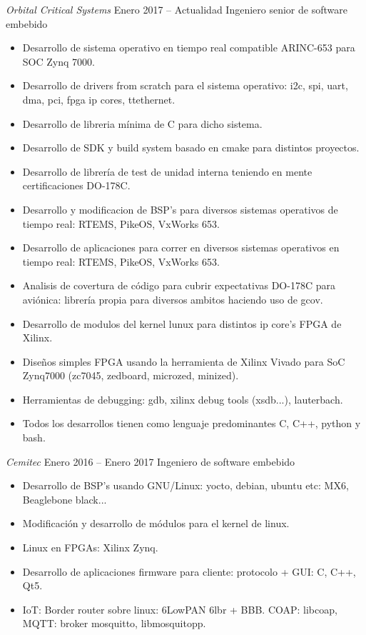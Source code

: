 \documentclass[10pt]{res} %
\begin{document}
\begin{resume}
{\sl Orbital Critical Systems} \hfill Enero 2017 -- Actualidad
\hfill Ingeniero senior de software embebido
\begin{itemize} \itemsep -2pt %
\item Desarrollo de sistema operativo en tiempo real compatible ARINC-653 para SOC Zynq 7000.
\item Desarrollo de drivers from scratch para el sistema operativo: i2c, spi, uart, dma, pci, fpga ip cores, ttethernet.
\item Desarrollo de libreria mínima de C para dicho sistema.
\item Desarrollo de SDK y build system basado en cmake para distintos proyectos.
\item Desarrollo de librería de test de unidad interna teniendo en mente certificaciones DO-178C.
\item Desarrollo y modificacion de BSP's para diversos sistemas operativos de tiempo real: RTEMS, PikeOS, VxWorks 653.
\item Desarrollo de aplicaciones para correr en diversos sistemas operativos en tiempo real: RTEMS, PikeOS, VxWorks 653.
\item Analisis de covertura de código para cubrir expectativas DO-178C para aviónica: librería propia para diversos ambitos haciendo uso de gcov.
\item Desarrollo de modulos del kernel lunux para distintos ip core's FPGA de Xilinx.
\item Diseños simples FPGA usando la herramienta de Xilinx Vivado para SoC Zynq7000 (zc7045, zedboard, microzed, minized).
\item Herramientas de debugging: gdb, xilinx debug tools (xsdb...), lauterbach.
\item Todos los desarrollos tienen como lenguaje predominantes C, C++, python y bash. 
\end{itemize}

{\sl Cemitec} \hfill Enero 2016 -- Enero 2017
\hfill Ingeniero de software embebido
\begin{itemize} \itemsep -2pt %
\item Desarrollo de BSP's usando GNU/Linux: yocto, debian, ubuntu etc: MX6, Beaglebone black...
\item Modificación y desarrollo de módulos para el kernel de linux.
\item Linux en FPGAs: Xilinx Zynq.
\item Desarrollo de aplicaciones firmware para cliente: protocolo + GUI: C, C++, Qt5. 
\item IoT: Border router sobre linux: 6LowPAN 6lbr + BBB. COAP: libcoap, MQTT: broker mosquitto, libmosquitopp.
\end{itemize}


\end{resume}
\end{document}
